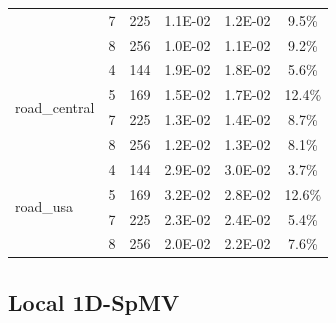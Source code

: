 \documentclass[conference, 10ppt]{IEEEtran}
\begin{document}
\begin{table}[htb]
\begin{tabular}[c]{| l | c | c | c | c | c |}
  &  7  &  225  &  1.1E-02  &  1.2E-02  &  9.5\% \\ \cline{2-6}
  &  8  &  256  &  1.0E-02  &  1.1E-02  &  9.2\% \\ \hline
\multirow{4}{*}{road\_central}  &  4  &  144  &  1.9E-02  &  1.8E-02  &  5.6\% \\ \cline{2-6}
  &  5  &  169  &  1.5E-02  &  1.7E-02  &  12.4\% \\ \cline{2-6}
  &  7  &  225  &  1.3E-02  &  1.4E-02  &  8.7\% \\ \cline{2-6}
\  &  8  &  256  &  1.2E-02  &  1.3E-02  &  8.1\% \\ \hline
\multirow{4}{*}{road\_usa}  &  4  &  144  &  2.9E-02  &  3.0E-02  &  3.7\% \\ \cline{2-6}
  &  5  &  169  &  3.2E-02  &  2.8E-02  &  12.6\% \\ \cline{2-6}
  &  7  &  225  &  2.3E-02  &  2.4E-02  &  5.4\% \\ \cline{2-6}
  &  8  &  256  &  2.0E-02  &  2.2E-02  &  7.6\% \\ \hline
\end{tabular}
\end{table}

\subsection{Local 1D-SpMV}
\end{document}
